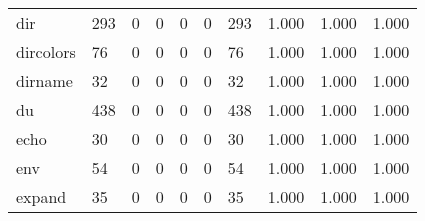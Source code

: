 \begin{longtable}{lp{1.3cm}p{1.3cm}p{1.3cm}p{1.3cm}p{1.3cm}p{1.3cm}p{1.3cm}p{1.3cm}p{1.3cm}}
dir       &                    293 &                                             0 &                                            0 &                                           0 &                                            0 &                                        293 &                                1.000 &                                  1.000 &                                1.000 \\
dircolors &                     76 &                                             0 &                                            0 &                                           0 &                                            0 &                                         76 &                                1.000 &                                  1.000 &                                1.000 \\
dirname   &                     32 &                                             0 &                                            0 &                                           0 &                                            0 &                                         32 &                                1.000 &                                  1.000 &                                1.000 \\
du        &                    438 &                                             0 &                                            0 &                                           0 &                                            0 &                                        438 &                                1.000 &                                  1.000 &                                1.000 \\
echo      &                     30 &                                             0 &                                            0 &                                           0 &                                            0 &                                         30 &                                1.000 &                                  1.000 &                                1.000 \\
env       &                     54 &                                             0 &                                            0 &                                           0 &                                            0 &                                         54 &                                1.000 &                                  1.000 &                                1.000 \\
expand    &                     35 &                                             0 &                                            0 &                                           0 &                                            0 &                                         35 &                                1.000 &                                  1.000 &                                1.000 \\

\end{longtable}
